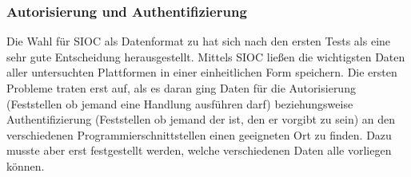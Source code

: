 

\subsubsection{Autorisierung und Authentifizierung} %
\label{ssub:autorisierung_und_authentifizierung}

Die Wahl für SIOC als Datenformat zu hat sich nach den ersten Tests als eine sehr gute Entscheidung herausgestellt. Mittels SIOC ließen die wichtigsten Daten aller untersuchten Plattformen in einer einheitlichen Form speichern. Die ersten Probleme traten erst auf, als es daran ging Daten für die Autorisierung (Feststellen ob jemand eine Handlung ausführen darf) beziehungsweise Authentifizierung (Feststellen ob jemand der ist, den er vorgibt zu sein) an den verschiedenen Programmierschnittstellen einen geeigneten Ort zu finden. Dazu musste aber erst festgestellt werden, welche verschiedenen Daten alle vorliegen können.

\medskip

